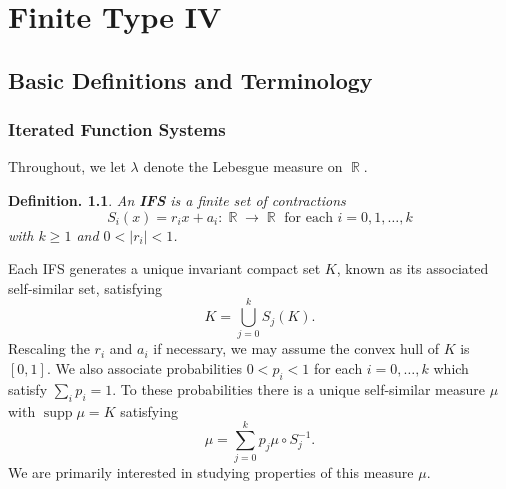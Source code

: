 \documentclass[11pt, a4paper]{memoir}
\DeclareMathOperator{\N}{{\mathbb{N}}}
\DeclareMathOperator{\R}{{\mathbb{R}}}
\theoremstyle{change}
\theoremstyle{plain}
\theoremstyle{nonumberplain}
\newtheorem{definition}{Definition.}
\DeclareMathOperator{\supp}{supp}
\numberwithin{equation}{section}
\begin{document}

\chapter{Finite Type IV}
\section{Basic Definitions and Terminology}
\subsection{Iterated Function Systems}
Throughout, we let $\lambda$ denote the Lebesgue measure on $\R$.
\begin{definition}
    An \textbf{IFS} is a finite set of contractions
    \begin{equation*}
        S_i(x) = r_ix+a_i:\R\to\R\text{ for each }i=0,1,\ldots,k
    \end{equation*}
    with $k\geq 1$ and $0<|r_i|<1$.
\end{definition}
Each IFS generates a unique invariant compact set $K$, known as its associated self-similar set, satisfying
\begin{equation*}
    K=\bigcup_{j=0}^kS_j(K).
\end{equation*}
Rescaling the $r_i$ and $a_i$ if necessary, we may assume the convex hull of $K$ is $[0,1]$.
We also associate probabilities $0<p_i<1$ for each $i=0,\ldots,k$ which satisfy $\sum_i p_i=1$.
To these probabilities there is a unique self-similar measure $\mu$ with $\supp\mu=K$ satisfying
\begin{equation}
    \mu=\sum_{j=0}^k p_j\mu\circ S_j^{-1}.\label{e:mu-def}
\end{equation}
We are primarily interested in studying properties of this measure $\mu$.
\end{document}
